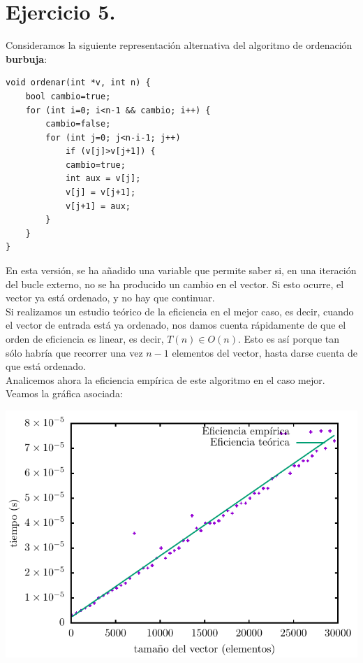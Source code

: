 \documentclass[11pt,a4paper]{article}
\begin{document}
\section*{Ejercicio 5.}

Consideramos la siguiente representación alternativa del algoritmo de ordenación \textbf{burbuja}:

\begin{lstlisting}
void ordenar(int *v, int n) {
    bool cambio=true;
    for (int i=0; i<n-1 && cambio; i++) {
        cambio=false;
        for (int j=0; j<n-i-1; j++)
            if (v[j]>v[j+1]) {
            cambio=true;
            int aux = v[j];
            v[j] = v[j+1];
            v[j+1] = aux;
        }
    }
}
\end{lstlisting}

En esta versión, se ha añadido una variable que permite saber si, en una iteración del bucle externo, no se ha producido un cambio en el vector. Si esto ocurre, el vector ya está ordenado, y no hay que continuar.\\

Si realizamos un estudio teórico de la eficiencia en el mejor caso, es decir, cuando el vector de entrada está ya ordenado, nos damos cuenta rápidamente de que el orden de eficiencia es linear, es decir, $T(n) \in O(n)$. Esto es así porque tan sólo habría que recorrer una vez $n-1$ elementos del vector, hasta darse cuenta de que está ordenado.\\

Analicemos ahora la eficiencia empírica de este algoritmo en el caso mejor. Veamos la gráfica asociada:

\begin{center}
	\includegraphics{img/tiempos_burbuja_optimizado.pdf}
\end{center}
\end{document}
